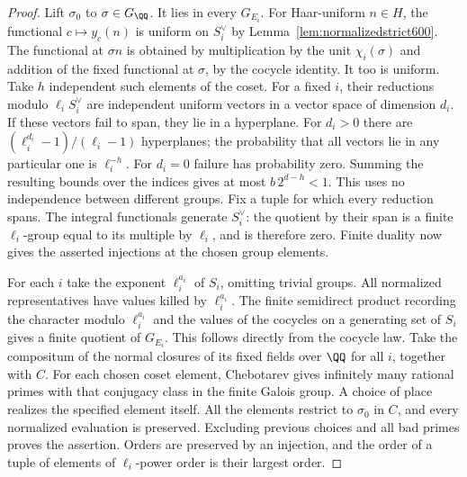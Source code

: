 \documentclass[a4paper,11pt]{article}
\theoremstyle{definition}
\theoremstyle{remark}
\numberwithin{equation}{section}
\begin{document}
\begin{proof}
Lift \(\sigma_0\) to \(\sigma\in G_\QQ\). It lies in
every \(G_{E_i}\). For Haar-uniform \(n\in H\), the
functional \(c\mapsto y_c(n)\) is uniform on \(S_i^\vee\)
by Lemma~\ref{lem:normalizedstrict600}. The functional
at \(\sigma n\) is obtained by multiplication by the
unit \(\chi_i(\sigma)\) and addition of the fixed
functional at \(\sigma\), by the cocycle identity.
It too is uniform. Take \(h\) independent such elements
of the coset. For a fixed \(i\), their reductions modulo
\(\ell_i S_i^\vee\) are independent uniform vectors in
a vector space of dimension \(d_i\). If these vectors
fail to span, they lie in a hyperplane. For \(d_i>0\)
there are \((\ell_i^{d_i}-1)/(\ell_i-1)\) hyperplanes;
the probability that all vectors lie in any particular
one is \(\ell_i^{-h}\). For \(d_i=0\) failure has
probability zero. Summing the resulting bounds over
the indices gives at most \(b\,2^{d-h}<1\).
This uses no independence between different groups.
Fix a tuple for which every reduction spans.
The integral functionals generate \(S_i^\vee\):
the quotient by their span is a finite \(\ell_i\)-group
equal to its multiple by \(\ell_i\), and is therefore
zero. Finite duality now gives the asserted injections
at the chosen group elements.

For each \(i\) take the exponent \(\ell_i^{a_i}\)
of \(S_i\), omitting trivial groups. All normalized
representatives have values killed by \(\ell_i^{a_i}\).
The finite semidirect product recording the character
modulo \(\ell_i^{a_i}\) and the values of the cocycles
on a generating set of \(S_i\) gives a finite quotient
of \(G_{E_i}\). This follows directly from the cocycle
law. Take the compositum of the normal closures of its
fixed fields over \(\QQ\) for all \(i\), together with
\(C\). For each chosen coset element, Chebotarev gives
infinitely many rational primes with that conjugacy
class in the finite Galois group. A choice of place
realizes the specified element itself. All the elements
restrict to \(\sigma_0\) in \(C\), and every normalized
evaluation is preserved. Excluding previous choices
and all bad primes proves the assertion. Orders are
preserved by an injection, and the order of a tuple of
elements of \(\ell_i\)-power order is their largest order.
\end{proof}
\end{document}
